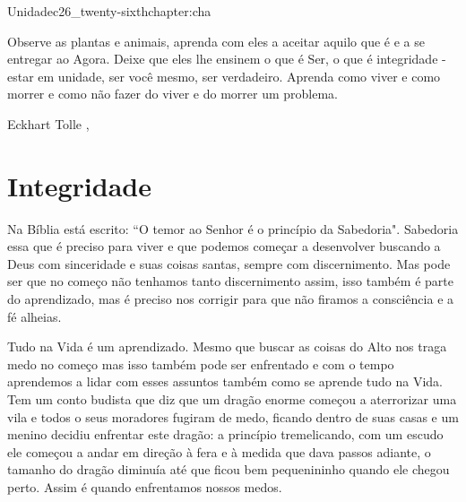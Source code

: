 \begin{chapterpage}{Unidade}{c26_twenty-sixthchapter:cha}

\begin{myquotation}Observe as plantas e animais, aprenda com eles a aceitar aquilo que é e a se entregar ao Agora. Deixe que eles lhe ensinem o que é Ser, o que é integridade - estar em unidade, ser você mesmo, ser verdadeiro. Aprenda como viver e como morrer e como não fazer do viver e do morrer um problema.

\par\vspace*{15mm}
\mbox{}\hfill \emdash{}Eckhart Tolle 
, %
\par\end{myquotation}

\end{chapterpage}



\section{Integridade}\label{c1_basicformatting:sec}

\emdash{}Na Bíblia está escrito: ``O temor ao Senhor é o princípio da Sabedoria". Sabedoria essa que é preciso para viver e que podemos começar a desenvolver buscando a Deus com sinceridade e suas coisas santas, sempre com discernimento. Mas pode ser que no começo não tenhamos tanto discernimento assim, isso também é parte do aprendizado, mas é preciso nos corrigir para que não firamos a consciência e a fé alheias.

\emdash{}Tudo na Vida é um aprendizado. Mesmo que buscar as coisas do Alto nos traga medo no começo mas isso também pode ser enfrentado e com o tempo aprendemos a lidar com esses assuntos também como se aprende tudo na Vida. Tem um conto budista que diz que um dragão enorme começou a aterrorizar uma vila e todos o seus moradores fugiram de medo, ficando dentro de suas casas e um menino decidiu enfrentar este dragão: a princípio tremelicando, com um escudo ele começou a andar em direção à fera e à medida que dava passos adiante, o tamanho do dragão diminuía até que ficou bem pequenininho quando ele chegou perto. Assim é quando enfrentamos nossos medos.

